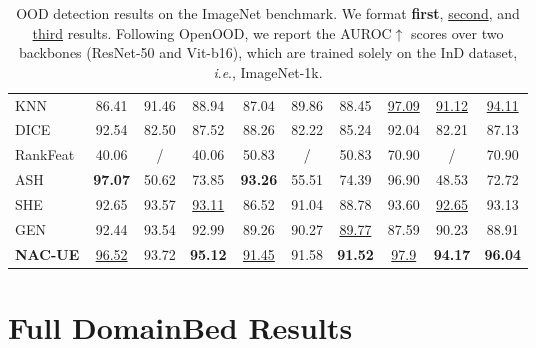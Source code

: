 \documentclass{article} \usepackage{iclr2024_conference,times}
\newcommand{\ie}{\textit{i}.\textit{e}.}
\begin{document}
\begin{table*}[h]
{\begin{tabular}{l ccc  ccc  ccc}
			KNN & 86.41 & 91.46 & 88.94 & 87.04 & 89.86 & 88.45  & \underline{97.09} & \underline{91.12} & \underline{94.11} \\ 
			DICE & 92.54 & 82.50 & 87.52 & 88.26 & 82.22 & 85.24  & 92.04 & 82.21 & 87.13 \\ 
			RankFeat & 40.06 & / & 40.06 & 50.83 & / & 50.83  & 70.90 & / & 70.90 \\ 
			ASH & \textbf{97.07} & 50.62 & 73.85 &\textbf{ 93.26} & 55.51 & 74.39  & 96.90 & 48.53 & 72.72 \\ 
			SHE & 92.65 & 93.57 & \underline{93.11} & 86.52 & 91.04 & 88.78  & 93.60 & \underline{92.65} & 93.13 \\ 
			GEN & 92.44 & 93.54 & 92.99 & 89.26 & 90.27 & \underline{89.77}  & 87.59 & 90.23 & 88.91 \\ 
			\rowcolor{LightGray}
			\textbf{NAC-UE} & \underline{96.52} & 93.72 & \textbf{95.12} & \underline{91.45} & 91.58 & \textbf{91.52} & \underline{97.9} & \textbf{94.17} & \textbf{96.04} \\ 
			\bottomrule
		\end{tabular}
		
	}
	\caption{OOD detection results on the ImageNet benchmark. We format \textbf{first}, \underline{second}, and \underline{third} results. Following OpenOOD, we report the AUROC$\uparrow$ scores over two backbones (ResNet-50 and Vit-b16), which are trained solely on the InD dataset, \ie, ImageNet-1k. }
	\label{Appendix:Tab:Full_OOD_Detection_ImageNet}
\end{table*}













\newpage
\section{Full DomainBed Results}
\label{Appendix:Sec_DomainBed_Results}
\end{document}
